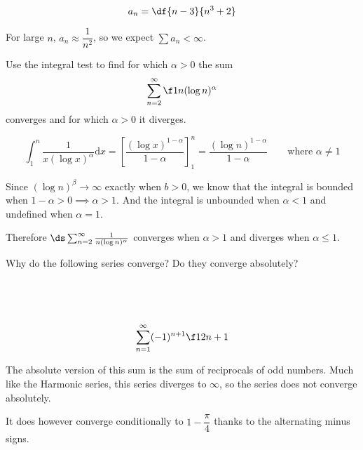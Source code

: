 \documentclass[a4paper]{article}
\begin{document}
\subsection{~} %

\begin{questionbody}
\[ a_n = \df{n - 3}{n^3 + 2} \]
\end{questionbody}

For large $n$, $a_n \approx \dfrac{1}{n^2}$, so we expect $\sum a_n < \infty$.


\begin{questionbody}
Use the integral test to find for which $\alpha > 0$ the sum \[
\sum_{n=2}^\infty \f 1{n (\log n)^\alpha}
\] converges and for which $\alpha > 0$ it diverges.
\end{questionbody}

$$\int_1^n \frac1{x (\log x)^\alpha} \mathrm d x = \left[ \frac{(\log x)^{1 - \alpha}}{1 - \alpha} \right]_1^n =  \frac{(\log n)^{1 - \alpha}}{1 - \alpha} \qquad \text{where } \alpha \ne 1$$

Since $(\log n)^\beta \to \infty$ exactly when $b > 0$, we know that the integral is bounded when $1 - \alpha > 0 \implies \alpha > 1$. And the integral is unbounded when $\alpha < 1$ and undefined when $\alpha = 1$.

Therefore $\ds\sum_{n=2}^\infty \frac1{n (\log n)^\alpha}$ converges when $\alpha > 1$ and diverges when $\alpha \le 1$.


\begin{questionbody}
Why do the following series converge? Do they converge absolutely?
\end{questionbody}

\subsection{~} %

\begin{questionbody}
\[ \sum_{n=1}^\infty (-1)^{n+1} \f1{2n+1} \]
\end{questionbody}

The absolute version of this sum is the sum of reciprocals of odd numbers. Much like the Harmonic series, this series diverges to $\infty$, so the series does not converge absolutely.

It does however converge conditionally to $1 - \dfrac\pi4$ thanks to the alternating minus signs.
\end{document}
